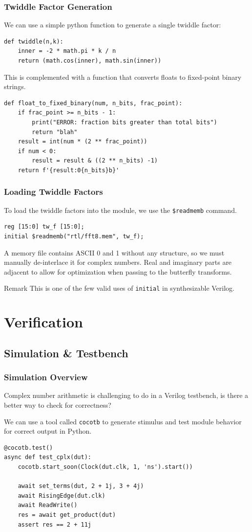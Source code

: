 \documentclass{beamer}
\begin{document}
\begin{frame}[fragile]
	\frametitle{Twiddle Factor Generation}
	We can use a simple python function to generate a single twiddle factor:
\begin{verbatim}
def twiddle(n,k):
    inner = -2 * math.pi * k / n
    return (math.cos(inner), math.sin(inner))
\end{verbatim}
This is complemented with a function that converts floats to fixed-point binary strings.
\begin{verbatim}
def float_to_fixed_binary(num, n_bits, frac_point):
    if frac_point >= n_bits - 1:
        print("ERROR: fraction bits greater than total bits")
        return "blah"
    result = int(num * (2 ** frac_point))
    if num < 0:
        result = result & ((2 ** n_bits) -1)
    return f'{result:0{n_bits}b}'
\end{verbatim}
\end{frame}

\begin{frame}[fragile]
	\frametitle{Loading Twiddle Factors}
	To load the twiddle factors into the module, we use the \texttt{\$readmemb}
	command.
\begin{verbatim}
reg [15:0] tw_f [15:0];
initial $readmemb("rtl/fft8.mem", tw_f);
\end{verbatim}
\pause
A memory file contains ASCII 0 and 1 without any structure, so we must manually de-interlace it for
complex numbers. Real and imaginary parts are adjacent to allow for optimization when passing
to the butterfly transforms.

\pause
\begin{block}{Remark}
	This is one of the few valid uses of \texttt{initial} in synthesizable Verilog.
\end{block}
\end{frame}

\section{Verification}

\subsection{Simulation \& Testbench}
\begin{frame}[fragile]
	\frametitle{Simulation Overview}
	Complex number arithmetic is challenging to do in a Verilog testbench, is there a better way
	to check for correctness?

	\pause
	 We can use a tool called \texttt{cocotb} to generate stimulus and
	test module behavior for correct output in Python.

	\pause
\begin{verbatim}
@cocotb.test()
async def test_cplx(dut):
    cocotb.start_soon(Clock(dut.clk, 1, 'ns').start())

    await set_terms(dut, 2 + 1j, 3 + 4j)
    await RisingEdge(dut.clk)
    await ReadWrite()
    res = await get_product(dut)
    assert res == 2 + 11j
\end{verbatim}
\end{frame}
\end{document}
